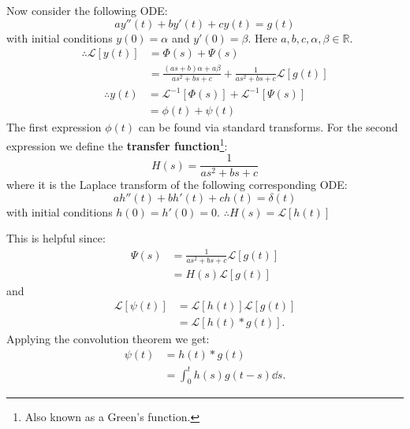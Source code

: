 \documentclass{article}
\begin{document}
Now consider the following ODE:
$$ay''(t)+by'(t)+cy(t)=g(t)$$
with initial conditions $y(0)=\alpha$
and $y'(0)=\beta$.
Here $a,b,c,\alpha,\beta\in\mathbb{R}$.
\begin{align*}
    \therefore\mathcal{L}[y(t)]
    &=\Phi(s)+\Psi(s) \\
    &=\frac{(as+b)\alpha+a\beta}
    {as^2+bs+c}
    +\frac{1}{as^2+bs+c}\mathcal{L}[g(t)]
\end{align*}
\begin{align*}
    \therefore y(t)
    &=\mathcal{L}^{-1}[\Phi(s)]
    +\mathcal{L}^{-1}[\Psi(s)] \\
    &=\phi(t)+\psi(t)
\end{align*}
The first expression $\phi(t)$ can be found via
standard transforms.
For the second expression we define the
\textbf{transfer function}\footnote{Also known as a Green's function.}:
$$H(s)=\frac{1}{as^2+bs+c}$$
where it is the Laplace transform of the following
corresponding ODE:
$$ah''(t)+bh'(t)+ch(t)=\delta(t)$$
with initial conditions $h(0)=h'(0)=0$.
$\therefore H(s)=\mathcal{L}[h(t)]$

This is helpful since:
\begin{align*}
    \Psi(s)
    &=\frac{1}{as^2+bs+c}\mathcal{L}[g(t)] \\
    &=H(s)\mathcal{L}[g(t)]
\end{align*}
and
\begin{align*}
    \mathcal{L}[\psi(t)]
    &=\mathcal{L}[h(t)]\mathcal{L}[g(t)] \\
    &=\mathcal{L}[h(t)*g(t)].
\end{align*}
Applying the convolution theorem we get:
\begin{align*}
    \psi(t)
    &=h(t)*g(t) \\
    &=\int_{0}^{t}h(s)g(t-s)\dd s.
\end{align*}

\newpage
\end{document}

